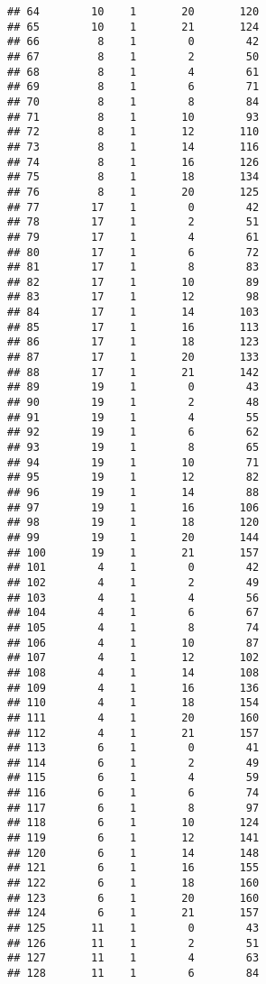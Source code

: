 \documentclass[
]{article}
\begin{document}
\begin{verbatim}
## 64        10    1       20       120
## 65        10    1       21       124
## 66         8    1        0        42
## 67         8    1        2        50
## 68         8    1        4        61
## 69         8    1        6        71
## 70         8    1        8        84
## 71         8    1       10        93
## 72         8    1       12       110
## 73         8    1       14       116
## 74         8    1       16       126
## 75         8    1       18       134
## 76         8    1       20       125
## 77        17    1        0        42
## 78        17    1        2        51
## 79        17    1        4        61
## 80        17    1        6        72
## 81        17    1        8        83
## 82        17    1       10        89
## 83        17    1       12        98
## 84        17    1       14       103
## 85        17    1       16       113
## 86        17    1       18       123
## 87        17    1       20       133
## 88        17    1       21       142
## 89        19    1        0        43
## 90        19    1        2        48
## 91        19    1        4        55
## 92        19    1        6        62
## 93        19    1        8        65
## 94        19    1       10        71
## 95        19    1       12        82
## 96        19    1       14        88
## 97        19    1       16       106
## 98        19    1       18       120
## 99        19    1       20       144
## 100       19    1       21       157
## 101        4    1        0        42
## 102        4    1        2        49
## 103        4    1        4        56
## 104        4    1        6        67
## 105        4    1        8        74
## 106        4    1       10        87
## 107        4    1       12       102
## 108        4    1       14       108
## 109        4    1       16       136
## 110        4    1       18       154
## 111        4    1       20       160
## 112        4    1       21       157
## 113        6    1        0        41
## 114        6    1        2        49
## 115        6    1        4        59
## 116        6    1        6        74
## 117        6    1        8        97
## 118        6    1       10       124
## 119        6    1       12       141
## 120        6    1       14       148
## 121        6    1       16       155
## 122        6    1       18       160
## 123        6    1       20       160
## 124        6    1       21       157
## 125       11    1        0        43
## 126       11    1        2        51
## 127       11    1        4        63
## 128       11    1        6        84

\end{verbatim}
\end{document}
